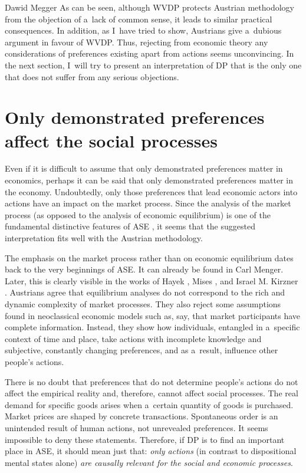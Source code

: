 \begin{artengenv}{Dawid Megger}
As can be seen, although WVDP protects Austrian methodology from the objection of a~lack of common sense, it leads to similar practical consequences. In addition, as I~have tried to show, Austrians give a~dubious argument in favour of WVDP. Thus, rejecting from economic theory any considerations of preferences existing apart from actions seems unconvincing. In the next section, I~will try to present an interpretation of DP that is the only one that does not suffer from any serious objections.



\section{Only demonstrated preferences affect the social processes}

Even if it is difficult to assume that only demonstrated preferences matter in economics, perhaps it can be said that only demonstrated preferences matter in the economy. Undoubtedly, only those preferences that lead economic actors into actions have an impact on the market process. Since the analysis of the market process (as opposed to the analysis of economic equilibrium) is one of the fundamental distinctive features of ASE 
\parencites[][]{rothbard_present_2011}[][]{coyne_austrian_2015}, %
 it seems that the suggested interpretation fits well with the Austrian methodology.



The emphasis on the market process rather than on economic equilibrium dates back to the very beginnings of ASE. It can already be found in Carl Menger. Later, this is clearly visible in the works of Hayek 
\parencite*[][]{hayek_use_1945}, %
 Mises 
\parencite*[][]{mises_human_1998}, %
 and Israel M. Kirzner 
\parencite*[][]{kirzner_competition_1973}. %
 Austrians agree that equilibrium analyses do not correspond to the rich and dynamic complexity of market processes. They also reject some assumptions found in neoclassical economic models such as, say, that market participants have complete information. Instead, they show how individuals, entangled in a~specific context of time and place, take actions with incomplete knowledge and subjective, constantly changing preferences, and as a~result, influence other people's actions.



There is no doubt that preferences that do not determine people's actions do not affect the empirical reality and, therefore, cannot affect social processes. The real demand for specific goods arises when a~certain quantity of goods is purchased. Market prices are shaped by concrete transactions. Spontaneous order is an unintended result of human actions, not unrevealed preferences. It seems impossible to deny these statements. Therefore, if DP is to find an important place in ASE, it should mean just that: \textit{only actions} (in contrast to dispositional mental states alone) \textit{are causally relevant for the social and economic processes}.




\end{artengenv}
